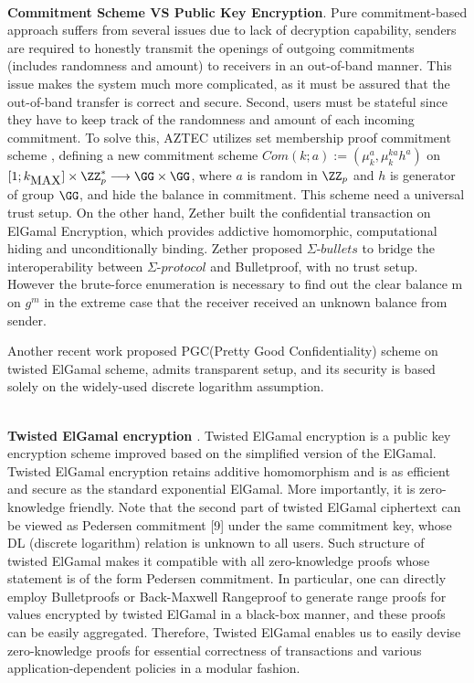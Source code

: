 \documentclass{article}
\begin{document}
~\\
\noindent\noindent\textbf{Commitment Scheme VS Public Key Encryption}. Pure commitment-based approach suffers from several issues due to lack of decryption capability, senders are required to honestly transmit the openings of outgoing commitments (includes randomness and amount) to receivers in an out-of-band manner. This issue makes the system much more complicated, as it must be assured that the out-of-band transfer is correct and secure. Second, users must be stateful since they have to keep track of the randomness and amount of each incoming commitment. To solve this, AZTEC utilizes set membership proof commitment scheme \cite{camenisch2008efficient,arfaoui2015practical}, defining a new commitment scheme $ Com(k; a) := (\mu_k^a, \mu_k^{ka}h^a)$ on $[1; k_{\mbox{MAX}}] \times \ZZ_p^{*} \longrightarrow \GG \times \GG$, where $a$ is random in $\ZZ_p$ and $h$ is generator of group $\GG$, and hide the balance in commitment. This scheme need a universal trust setup.  On the other hand,  Zether built the confidential transaction on ElGamal Encryption\cite{elgamal1985public}, which provides addictive homomorphic, computational hiding and unconditionally binding. Zether proposed $\Sigma\mbox{-}bullets$ to bridge the interoperability between $\Sigma\mbox{-}protocol$ and Bulletproof\cite{bunz2018bulletproofs}, with no trust setup. However the brute-force enumeration is necessary to find out the clear balance m on $g^m$ in the extreme case that the receiver received an unknown balance from sender.

Another recent work \cite{chen2020pgc} proposed PGC(Pretty Good Confidentiality) scheme on twisted ElGamal scheme, admits transparent setup, and its security is based solely on the widely-used discrete logarithm assumption. 

~\\
\noindent\textbf{Twisted ElGamal encryption \cite{chen2020pgc}}. Twisted ElGamal encryption is a public key encryption scheme improved based on the simplified version of the ElGamal. Twisted ElGamal encryption retains additive homomorphism and is as efficient and secure as the standard exponential ElGamal. More importantly, it is zero-knowledge friendly. Note that the second part of twisted ElGamal ciphertext can be viewed as Pedersen commitment [9] under the same commitment key, whose DL (discrete logarithm) relation is unknown to all users. Such structure of twisted ElGamal makes it compatible with all zero-knowledge proofs whose statement is of the form Pedersen commitment. In particular, one can directly employ Bulletproofs\cite{bunz2018bulletproofs} or Back-Maxwell Rangeproof\cite{10.1007/978-3-662-58820-8_4} to generate range proofs for values encrypted by twisted ElGamal in a black-box manner, and these proofs can be easily aggregated. Therefore, Twisted ElGamal enables us to easily devise zero-knowledge proofs for essential correctness of transactions and various application-dependent policies in a modular fashion. 
\end{document}
